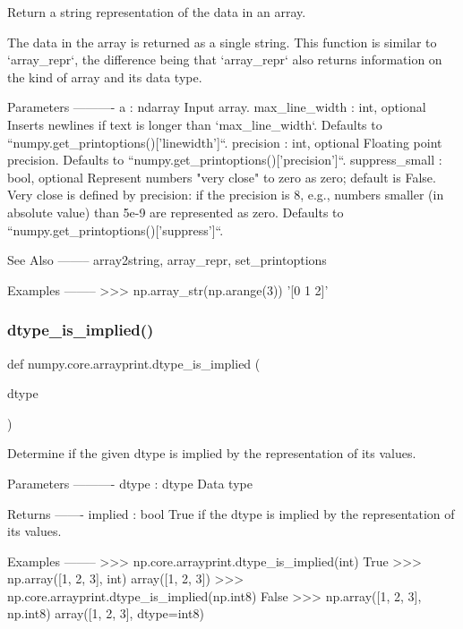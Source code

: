 \begin{DoxyVerb}Return a string representation of the data in an array.

The data in the array is returned as a single string.  This function is
similar to `array_repr`, the difference being that `array_repr` also
returns information on the kind of array and its data type.

Parameters
----------
a : ndarray
    Input array.
max_line_width : int, optional
    Inserts newlines if text is longer than `max_line_width`.
    Defaults to ``numpy.get_printoptions()['linewidth']``.
precision : int, optional
    Floating point precision.
    Defaults to ``numpy.get_printoptions()['precision']``.
suppress_small : bool, optional
    Represent numbers "very close" to zero as zero; default is False.
    Very close is defined by precision: if the precision is 8, e.g.,
    numbers smaller (in absolute value) than 5e-9 are represented as
    zero.
    Defaults to ``numpy.get_printoptions()['suppress']``.

See Also
--------
array2string, array_repr, set_printoptions

Examples
--------
>>> np.array_str(np.arange(3))
'[0 1 2]'\end{DoxyVerb}
 \mbox{\label{namespacenumpy_1_1core_1_1arrayprint_a630f2590107cb2c3416fa8a554e2ff1d}} 
\subsubsection{\texorpdfstring{dtype\+\_\+is\+\_\+implied()}{dtype\_is\_implied()}}
{\footnotesize\ttfamily def numpy.\+core.\+arrayprint.\+dtype\+\_\+is\+\_\+implied (\begin{DoxyParamCaption}\item[{}]{dtype }\end{DoxyParamCaption})}

\begin{DoxyVerb}Determine if the given dtype is implied by the representation of its values.

Parameters
----------
dtype : dtype
    Data type

Returns
-------
implied : bool
    True if the dtype is implied by the representation of its values.

Examples
--------
>>> np.core.arrayprint.dtype_is_implied(int)
True
>>> np.array([1, 2, 3], int)
array([1, 2, 3])
>>> np.core.arrayprint.dtype_is_implied(np.int8)
False
>>> np.array([1, 2, 3], np.int8)
array([1, 2, 3], dtype=int8)
\end{DoxyVerb}
 \mbox{\label{namespacenumpy_1_1core_1_1arrayprint_ab37467384567a1961f85f1ccf0e92d31}} 
